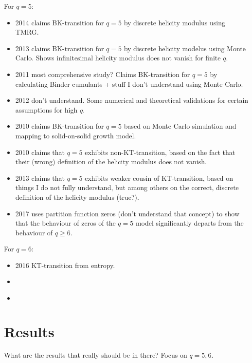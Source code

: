 For $q = 5$:
\begin{itemize}
  \item \cite{chatelain2014dmrg} 2014 claims BK-transition for $q = 5$ by discrete helicity modulus using TMRG.
  \item \cite{kumano2013response} 2013 claims BK-transition for $q = 5$ by discrete helicity modelus using Monte Carlo.
  Shows infinitesimal helicity modulus does not vanish for finite $q$.
  \item \cite{borisenko2011numerical} 2011 most comprehensive study? Claims BK-transition for $q = 5$ by calculating
  Binder cumulants + stuff I don't understand using Monte Carlo.
  \item \cite{borisenko2012phase} 2012 don't understand. Some numerical and theoretical validations for certain
  assumptions for high $q$.
  \item \cite{brito2010twodimensional} 2010 claims BK-transition for $q = 5$ based on Monte Carlo simulation and mapping
  to solid-on-solid growth model.
  \item \cite{baek2010non} 2010 claims that $q = 5$ exhibits non-KT-transition, based on the fact that their (wrong)
  definition of the helicity modulus does not vanish.
  \item \cite{baek2013residual} 2013 claims that $q = 5$ exhibits weaker cousin of KT-transition, based on things I do
  not fully understand, but among others on the correct, discrete definition of the helicity modulus (true?).
  \item \cite{kim2017partition} 2017 uses partition function zeros (don't understand that concept) to show that the
  behaviour of zeros of the $q = 5$ model significantly departs from the behaviour of $q \geq 6$.
\end{itemize}

For $q = 6$:
\begin{itemize}
  \item \cite{krvcmar2016phase} 2016 KT-transition from entropy.
  \item \cite{baek2013residual}
  \item \cite{kumano2013response}
\end{itemize}

\section{Results}

What are the results that really should be in there? Focus on $q = 5, 6$.

